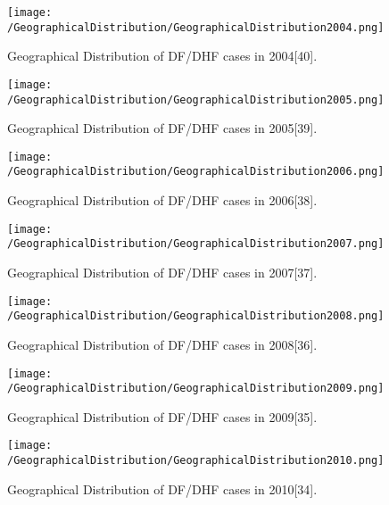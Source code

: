 \documentclass[11pt]{exam}
\begin{document}
\begin{questions}
\begin{enumerate}
\begin{figure}[H]
  \centering
   \texttt{[image: /GeographicalDistribution/GeographicalDistribution2004.png]} 
  \caption{Geographical Distribution of DF/DHF cases in 2004[40].}
   \label{Geographical Distribution of DF/DHF Clusters}
\end{figure} 

\begin{figure}[H]
  \centering
   \texttt{[image: /GeographicalDistribution/GeographicalDistribution2005.png]} 
  \caption{Geographical Distribution of DF/DHF cases in 2005[39].}
   \label{Geographical Distribution of DF/DHF Clusters}
\end{figure} 

\begin{figure}[H]
  \centering
   \texttt{[image: /GeographicalDistribution/GeographicalDistribution2006.png]} 
  \caption{Geographical Distribution of DF/DHF cases in 2006[38].}
   \label{Geographical Distribution of DF/DHF Clusters}
\end{figure} 

\begin{figure}[H]
  \centering
   \texttt{[image: /GeographicalDistribution/GeographicalDistribution2007.png]} 
  \caption{Geographical Distribution of DF/DHF cases in 2007[37].}
   \label{Geographical Distribution of DF/DHF Clusters}
\end{figure} 

\begin{figure}[H]
  \centering
   \texttt{[image: /GeographicalDistribution/GeographicalDistribution2008.png]} 
  \caption{Geographical Distribution of DF/DHF cases in 2008[36].}
   \label{Geographical Distribution of DF/DHF Clusters}
\end{figure} 

\begin{figure}[H]
  \centering
   \texttt{[image: /GeographicalDistribution/GeographicalDistribution2009.png]} 
  \caption{Geographical Distribution of DF/DHF cases in 2009[35].}
   \label{Geographical Distribution of DF/DHF Clusters}
\end{figure} 

\begin{figure}[H]
  \centering
   \texttt{[image: /GeographicalDistribution/GeographicalDistribution2010.png]} 
  \caption{Geographical Distribution of DF/DHF cases in 2010[34].}
   \label{Geographical Distribution of DF/DHF Clusters}
\end{figure} 


\end{enumerate}
\end{questions}
\end{document}

